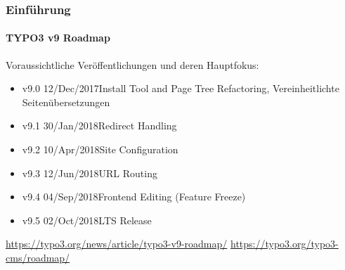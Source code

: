 \begin{frame}[fragile]
	\frametitle{Einführung}
	\framesubtitle{TYPO3 v9 Roadmap}

	Voraussichtliche Veröffentlichungen und deren Hauptfokus:

	\begin{itemize}

		\item v9.0 \tabto{1.1cm}12/Dec/2017\tabto{3.4cm}Install Tool and Page Tree Refactoring,\newline
			\tabto{3.4cm}Vereinheitlichte Seitenübersetzungen
		\item v9.1 \tabto{1.1cm}30/Jan/2018\tabto{3.4cm}Redirect Handling
		\item
			\begingroup
				\color{typo3orange}
					v9.2 \tabto{1.1cm}10/Apr/2018\tabto{3.4cm}Site Configuration
			\endgroup
		\item v9.3 \tabto{1.1cm}12/Jun/2018\tabto{3.4cm}URL Routing 
		\item v9.4 \tabto{1.1cm}04/Sep/2018\tabto{3.4cm}Frontend Editing (Feature Freeze)
		\item v9.5 \tabto{1.1cm}02/Oct/2018\tabto{3.4cm}LTS Release

	\end{itemize}

	\smaller
		\url{https://typo3.org/news/article/typo3-v9-roadmap/}\newline
		\url{https://typo3.org/typo3-cms/roadmap/}
	\normalsize

\end{frame}

